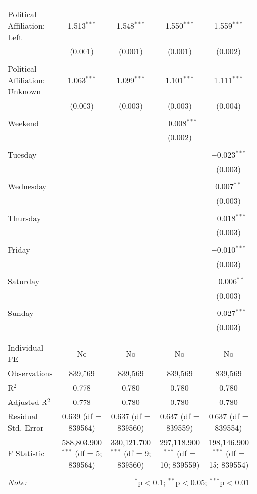 \documentclass[
]{article}
\begin{document}
\begin{table}[!htbp]
{\begin{tabular}{@{\extracolsep{5pt}}lcccc}
  & & & & \\ 
 Political Affiliation: Left & 1.513$^{***}$ & 1.548$^{***}$ & 1.550$^{***}$ & 1.559$^{***}$ \\ 
  & (0.001) & (0.001) & (0.001) & (0.002) \\ 
  & & & & \\ 
 Political Affiliation: Unknown & 1.063$^{***}$ & 1.099$^{***}$ & 1.101$^{***}$ & 1.111$^{***}$ \\ 
  & (0.003) & (0.003) & (0.003) & (0.004) \\ 
  & & & & \\ 
 Weekend &  &  & $-$0.008$^{***}$ &  \\ 
  &  &  & (0.002) &  \\ 
  & & & & \\ 
 Tuesday &  &  &  & $-$0.023$^{***}$ \\ 
  &  &  &  & (0.003) \\ 
  & & & & \\ 
 Wednesday &  &  &  & 0.007$^{**}$ \\ 
  &  &  &  & (0.003) \\ 
  & & & & \\ 
 Thursday &  &  &  & $-$0.018$^{***}$ \\ 
  &  &  &  & (0.003) \\ 
  & & & & \\ 
 Friday &  &  &  & $-$0.010$^{***}$ \\ 
  &  &  &  & (0.003) \\ 
  & & & & \\ 
 Saturday &  &  &  & $-$0.006$^{**}$ \\ 
  &  &  &  & (0.003) \\ 
  & & & & \\ 
 Sunday &  &  &  & $-$0.027$^{***}$ \\ 
  &  &  &  & (0.003) \\ 
  & & & & \\ 
\hline \\[-1.8ex] 
Individual FE & No & No & No & No \\ 
Observations & 839,569 & 839,569 & 839,569 & 839,569 \\ 
R$^{2}$ & 0.778 & 0.780 & 0.780 & 0.780 \\ 
Adjusted R$^{2}$ & 0.778 & 0.780 & 0.780 & 0.780 \\ 
Residual Std. Error & 0.639 (df = 839564) & 0.637 (df = 839560) & 0.637 (df = 839559) & 0.637 (df = 839554) \\ 
F Statistic & 588,803.900$^{***}$ (df = 5; 839564) & 330,121.700$^{***}$ (df = 9; 839560) & 297,118.900$^{***}$ (df = 10; 839559) & 198,146.900$^{***}$ (df = 15; 839554) \\ 
\hline 
\hline \\[-1.8ex] 
\textit{Note:}  & \multicolumn{4}{r}{$^{*}$p$<$0.1; $^{**}$p$<$0.05; $^{***}$p$<$0.01} \\ 
\end{tabular}
} 
\end{table} 
\newpage
\end{document}
